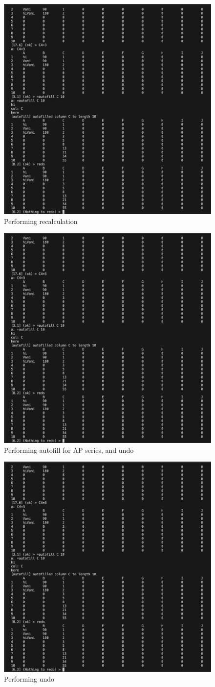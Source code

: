         \begin{figure}[H]
            \centering
            \includegraphics[width=0.5\linewidth]{image.png}
            \caption{Performing recalculation}
            \label{fig:enter-label}
        \end{figure}
        
        \begin{figure}[H]
            \centering
            \includegraphics[width=0.5\linewidth]{image.png}
            \caption{Performing autofill for AP series, and undo}
            \label{fig:enter-label}
        \end{figure}
        
        \begin{figure}[H]
            \centering
            \includegraphics[width=0.5\linewidth]{image.png}
            \caption{Performing undo}
            \label{fig:enter-label}
        \end{figure}
        
